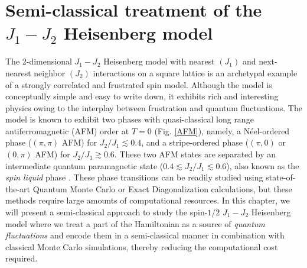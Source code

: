 \documentclass[../journal_main.tex]{subfiles}
\begin{document}
\chapter{Semi-classical treatment of the $J_1 - J_2$ Heisenberg model}
The 2-dimensional $J_1 - J_2$ Heisenberg model with nearest $(J_1)$ and next-nearest neighbor $(J_2)$ interactions on a square lattice is an archetypal example of a strongly correlated and frustrated spin model. Although the model is conceptually simple and easy to write down, it exhibits rich and interesting physics owing to the interplay between frustration and quantum fluctuations. The model is known to exhibit two phases with quasi-classical long range antiferromagnetic (AFM) order at $T = 0$ (Fig. \ref{AFM}), namely, a Néel-ordered phase ($(\pi,\pi)$ AFM) for $J_2/J_1 \lesssim 0.4$, and a stripe-ordered phase ($(\pi, 0)$ or $(0, \pi)$ AFM) for $J_2/J_1 \gtrsim 0.6$. These two AFM states are separated by an intermediate quantum paramagnetic state ($0.4 \lesssim J_2/J_1 \lesssim 0.6$), also known as the \textit{spin liquid} phase \cite{Li_2014}. These phase transitions can be readily studied using state-of-the-art Quantum Monte Carlo or Exact Diagonalization calculations, but these methods require large amounts of computational resources. In this chapter, we will present a semi-classical approach to study the spin-$1/2$ $J_1-J_2$ Heisenberg model where we treat a part of the Hamiltonian as a source of \textit{quantum fluctuations} and encode them in a semi-classical manner in combination with classical Monte Carlo simulations, thereby reducing the computational cost required.
\end{document}
